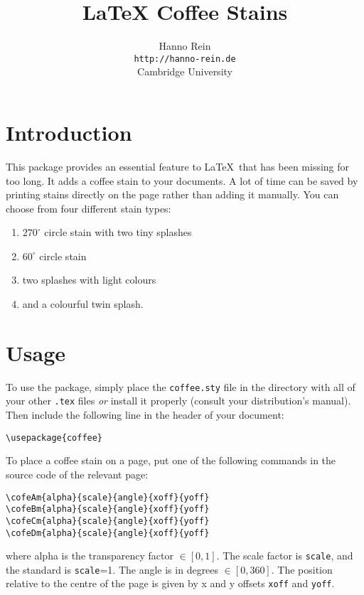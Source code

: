\documentclass{article}
\begin{document}
\title{LaTeX Coffee Stains}
\author{Hanno Rein\\
\texttt{http://hanno-rein.de}\\
Cambridge University}
\maketitle


\section{Introduction}
This package provides an essential feature to \LaTeX~that has been missing for too long. It adds a coffee stain to your documents. A lot of time can be saved by printing stains directly on the page rather than adding it manually. You can choose from four different stain types:
\begin{enumerate}
  \item $270^\circ$ circle stain with two tiny splashes 
  \item $60^\circ$ circle stain 
  \item two splashes with light colours
  \item and a colourful twin splash.
\end{enumerate}

\section{Usage}
To use the package, simply place the \texttt{coffee.sty} file in the directory with all of your 
other \texttt{.tex} files \textit{or} install it properly (consult your distribution's manual). 
Then include the following line in the header of your document:
\begin{verbatim}
\usepackage{coffee}
\end{verbatim}
To place a coffee stain on a page, put one of the following commands in the source code of the relevant page: 
\begin{verbatim}
\cofeAm{alpha}{scale}{angle}{xoff}{yoff}
\cofeBm{alpha}{scale}{angle}{xoff}{yoff}
\cofeCm{alpha}{scale}{angle}{xoff}{yoff}
\cofeDm{alpha}{scale}{angle}{xoff}{yoff}
\end{verbatim}
where alpha is the transparency factor $\in [0,1]$. The scale factor is {\tt scale}, and the standard is {\tt scale}=1. 
The angle is in degrees $\in [0,360]$. 
The position relative to the centre of the page is given by x and y
offsets \texttt{xoff} and \texttt{yoff}.
\end{document}
